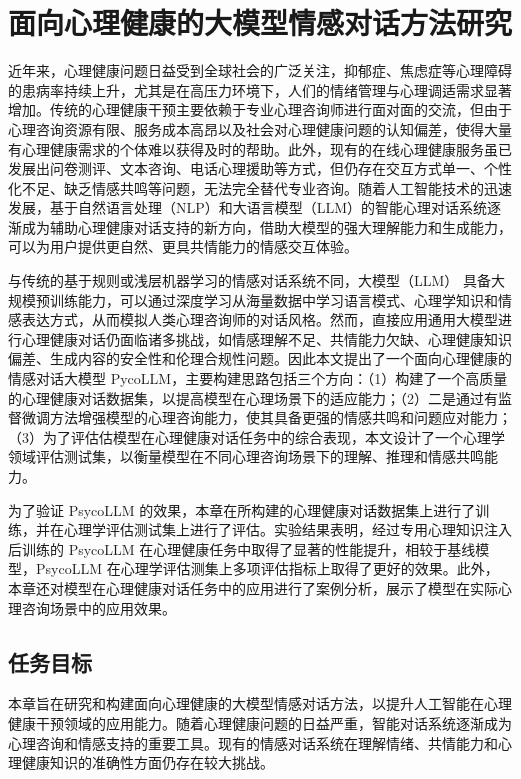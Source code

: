 
\chapter{面向心理健康的大模型情感对话方法研究}

近年来，心理健康问题日益受到全球社会的广泛关注，抑郁症、焦虑症等心理障碍的患病率持续上升，尤其是在高压力环境下，人们的情绪管理与心理调适需求显著增加。传统的心理健康干预主要依赖于专业心理咨询师进行面对面的交流，但由于心理咨询资源有限、服务成本高昂以及社会对心理健康问题的认知偏差，使得大量有心理健康需求的个体难以获得及时的帮助。此外，现有的在线心理健康服务虽已发展出问卷测评、文本咨询、电话心理援助等方式，但仍存在交互方式单一、个性化不足、缺乏情感共鸣等问题，无法完全替代专业咨询。随着人工智能技术的迅速发展，基于自然语言处理（NLP）和大语言模型（LLM）的智能心理对话系统逐渐成为辅助心理健康对话支持的新方向，借助大模型的强大理解能力和生成能力，可以为用户提供更自然、更具共情能力的情感交互体验。

与传统的基于规则或浅层机器学习的情感对话系统不同，大模型（LLM） 具备大规模预训练能力，可以通过深度学习从海量数据中学习语言模式、心理学知识和情感表达方式，从而模拟人类心理咨询师的对话风格。然而，直接应用通用大模型进行心理健康对话仍面临诸多挑战，如情感理解不足、共情能力欠缺、心理健康知识偏差、生成内容的安全性和伦理合规性问题。因此本文提出了一个面向心理健康的情感对话大模型 PycoLLM，主要构建思路包括三个方向：（1）构建了一个高质量的心理健康对话数据集，以提高模型在心理场景下的适应能力；（2）二是通过有监督微调方法增强模型的心理咨询能力，使其具备更强的情感共鸣和问题应对能力；（3）为了评估估模型在心理健康对话任务中的综合表现，本文设计了一个心理学领域评估测试集，以衡量模型在不同心理咨询场景下的理解、推理和情感共鸣能力。

为了验证 PsycoLLM 的效果，本章在所构建的心理健康对话数据集上进行了训练，并在心理学评估测试集上进行了评估。实验结果表明，经过专用心理知识注入后训练的 PsycoLLM 在心理健康任务中取得了显著的性能提升，相较于基线模型，PsycoLLM 在心理学评估测集上多项评估指标上取得了更好的效果。此外，本章还对模型在心理健康对话任务中的应用进行了案例分析，展示了模型在实际心理咨询场景中的应用效果。

\section{任务目标}

本章旨在研究和构建面向心理健康的大模型情感对话方法，以提升人工智能在心理健康干预领域的应用能力。随着心理健康问题的日益严重，智能对话系统逐渐成为心理咨询和情感支持的重要工具。现有的情感对话系统在理解情绪、共情能力和心理健康知识的准确性方面仍存在较大挑战。

